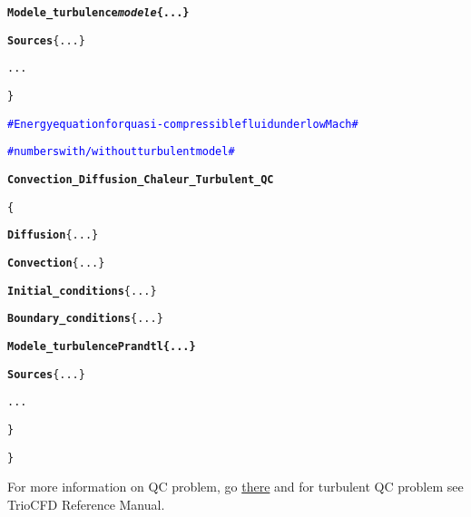 \begin{center}
{\begin{minipage}[c]{0.95\textwidth}
\begin{alltt}
\hspace{2cm}        {\bf{\textcolor{Greeen}{Modele\_turbulence \textit{modele} \{ ... \} } }}

\hspace{2cm}        {\bf{Sources}} \{ ... \}

\hspace{2cm}       ...

\hspace{1cm}    \}

\hspace{1cm}    \textcolor{blue}{\# Energy equation for quasi-compressible fluid under low Mach \#}

\hspace{1cm}    \textcolor{blue}{\# numbers with/without turbulent model \#}

\hspace{1cm}    {\bf{Convection\_Diffusion\_Chaleur}\textcolor{Greeen}{\_Turbulent}\_QC}

\hspace{1cm}    \{

\hspace{2cm}        {\bf{Diffusion}} \{ ... \}

\hspace{2cm}        {\bf{Convection}} \{ ... \}

\hspace{2cm}        {\bf{Initial\_conditions}} \{ ... \}

\hspace{2cm}        {\bf{Boundary\_conditions}} \{ ... \}

\hspace{2cm}        {\bf{\textcolor{Greeen}{Modele\_turbulence Prandtl \{ ... \} } }}

\hspace{2cm}        {\bf{Sources}} \{ ... \}

\hspace{2cm}        ...

\hspace{1cm}    \}

\}
\end{alltt}
\end{minipage}}
\end{center}

For more information on QC problem, go \href{\REFERENCEMANUAL\#pbthermohydrauliqueqc}{there} and for turbulent QC problem see TrioCFD Reference Manual.



